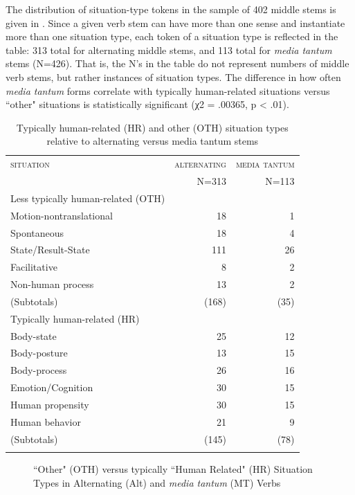 \documentclass[output=paper,colorlinks,citecolor=brown
]{langscibook}
\begin{document}
The distribution of situation-type tokens in the sample of 402 middle stems is given in . Since a given verb stem can have more than one sense and instantiate more than one situation type, each token of a situation type is reflected in the table: 313 total for alternating middle stems, and 113 total for \textit{media tantum} stems (N=426). That is, the N's in the table do not represent numbers of middle verb stems, but rather instances of situation types. The difference in how often \textit{media tantum} forms correlate with typically human-related situations versus ``other" situations is statistically significant (χ2 = .00365, p < .01). 

\begin{table}
\caption{Typically human-related (HR) and other (OTH) situation types relative to alternating versus media tantum stems}
\label{tab:Payne:Stats}
\begin{tabular}{lrr}
\lsptoprule
\textsc{situation} & \textsc{alternating} & \textsc{media tantum} \\
& N=313 & N=113 \\
\midrule
Less typically human-related (OTH)\\
Motion-nontranslational & 18 & 1 \\
Spontaneous & 18 & 4 \\
State/Result-State & 111 & 26 \\
Facilitative & 8 & 2 \\
Non-human process & 13 & 2 \\
(Subtotals) & (168) & (35) \\
\midrule
Typically human-related (HR)\\
Body-state & 25 & 12 \\
Body-posture & 13 & 15 \\
Body-process & 26 & 16 \\
Emotion/Cognition & 30 & 15 \\
Human propensity & 30 & 15 \\
Human behavior  & 21 & 9 \\
(Subtotals) & (145) & (78) \\
\lspbottomrule
\end{tabular}
\end{table}


\begin{figure}
\caption{``Other" (OTH) versus typically ``Human Related" (HR) Situation Types in Alternating (Alt) and \textit{media tantum} (MT) Verbs}
\label{fig:Payne:1}
\end{figure}
\end{document}
